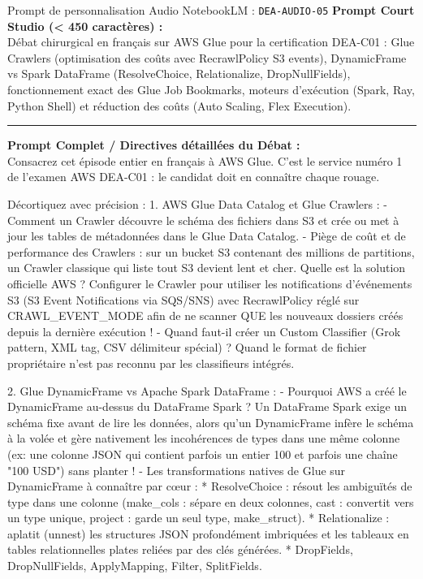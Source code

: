 \documentclass[11pt,a4paper]{article}
\begin{document}
\begin{promptbox}{Prompt de personnalisation Audio NotebookLM : \texttt{DEA-AUDIO-05}}
\textbf{Prompt Court Studio (< 450 caractères) :}\\
Débat chirurgical en français sur AWS Glue pour la certification DEA-C01 : Glue Crawlers (optimisation des coûts avec RecrawlPolicy S3 events), DynamicFrame vs Spark DataFrame (ResolveChoice, Relationalize, DropNullFields), fonctionnement exact des Glue Job Bookmarks, moteurs d'exécution (Spark, Ray, Python Shell) et réduction des coûts (Auto Scaling, Flex Execution).

\medskip\hrule\medskip
\textbf{Prompt Complet / Directives détaillées du Débat :}\\
Consacrez cet épisode entier en français à AWS Glue. C'est le service numéro 1 de l'examen AWS DEA-C01 : le candidat doit en connaître chaque rouage.

Décortiquez avec précision :
1. AWS Glue Data Catalog et Glue Crawlers :
- Comment un Crawler découvre le schéma des fichiers dans S3 et crée ou met à jour les tables de métadonnées dans le Glue Data Catalog.
- Piège de coût et de performance des Crawlers : sur un bucket S3 contenant des millions de partitions, un Crawler classique qui liste tout S3 devient lent et cher. Quelle est la solution officielle AWS ? Configurer le Crawler pour utiliser les notifications d'événements S3 (S3 Event Notifications via SQS/SNS) avec RecrawlPolicy réglé sur CRAWL\_EVENT\_MODE afin de ne scanner QUE les nouveaux dossiers créés depuis la dernière exécution !
- Quand faut-il créer un Custom Classifier (Grok pattern, XML tag, CSV délimiteur spécial) ? Quand le format de fichier propriétaire n'est pas reconnu par les classifieurs intégrés.

2. Glue DynamicFrame vs Apache Spark DataFrame :
- Pourquoi AWS a créé le DynamicFrame au-dessus du DataFrame Spark ? Un DataFrame Spark exige un schéma fixe avant de lire les données, alors qu'un DynamicFrame infère le schéma à la volée et gère nativement les incohérences de types dans une même colonne (ex: une colonne JSON qui contient parfois un entier 100 et parfois une chaîne "100 USD") sans planter !
- Les transformations natives de Glue sur DynamicFrame à connaître par cœur :
  * ResolveChoice : résout les ambiguïtés de type dans une colonne (make\_cols : sépare en deux colonnes, cast : convertit vers un type unique, project : garde un seul type, make\_struct).
  * Relationalize : aplatit (unnest) les structures JSON profondément imbriquées et les tableaux en tables relationnelles plates reliées par des clés générées.
  * DropFields, DropNullFields, ApplyMapping, Filter, SplitFields.


\end{promptbox}
\end{document}
